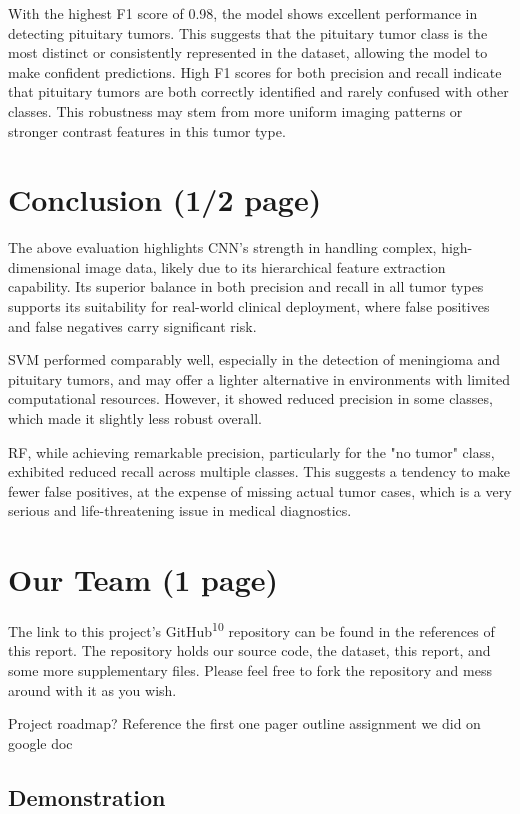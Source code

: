 \documentclass[conference]{IEEEtran}
\begin{document}
With the highest F1 score of 0.98, the model shows excellent performance in detecting pituitary tumors. This suggests that the pituitary tumor class is the most distinct or consistently represented in the dataset, allowing the model to make confident predictions. High F1 scores for both precision and recall indicate that pituitary tumors are both correctly identified and rarely confused with other classes. This robustness may stem from more uniform imaging patterns or stronger contrast features in this tumor type.

\section{\large Conclusion (1/2 page)}

The above evaluation highlights CNN's strength in handling complex, high-dimensional image data, likely due to its hierarchical feature extraction capability. Its superior balance in both precision and recall in all tumor types supports its suitability for real-world clinical deployment, where false positives and false negatives carry significant risk.

SVM performed comparably well, especially in the detection of meningioma and pituitary tumors, and may offer a lighter alternative in environments with limited computational resources. However, it showed reduced precision in some classes, which made it slightly less robust overall.

RF, while achieving remarkable precision, particularly for the "no tumor" class, exhibited reduced recall across multiple classes. This suggests a tendency to make fewer false positives, at the expense of missing actual tumor cases, which is a very serious and life-threatening issue in medical diagnostics.

\section{\large Our Team (1 page)}

The link to this project's GitHub\textsuperscript{10} repository can be found in the references of this report. The repository holds our source code, the dataset, this report, and some more supplementary files. Please feel free to fork the repository and mess around with it as you wish.

Project roadmap? Reference the first one pager outline assignment we did on google doc

\subsection{\large Demonstration}
\end{document}
